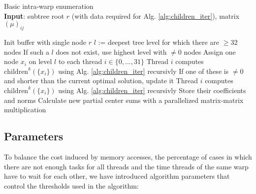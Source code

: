 \documentclass{scrartcl}
\begin{document}
    \begin{algorithm}[H]
        \caption{Basic intra-warp enumeration\label{alg:warp_enum}\\\textbf{Input}: subtree root $r$ (with data required for Alg. \ref{alg:children_iter}), matrix $(\mu)_{ij}$}
        \begin{algorithmic}
            \STATE Init buffer with single node $r$
                \STATE $l$ := deepest tree level for which there are $\geq 32$ nodes
                \STATE If such a $l$ does not exist, use highest level with $\neq 0$ nodes
                \STATE Assign one node $x_i$ on level $l$ to each thread $i \in \{0, ..., 31\}$
                    \STATE Thread $i$ computes $\mathrm{children}^k(\{x_i\})$ using Alg. \ref{alg:children_iter} recursivly
                    \STATE If one of these is $\neq 0$ and shorter than the current optimal solution, update it
                \ELSE
                    \STATE Thread $i$ computes $\mathrm{children}^k(\{x_i\})$ using Alg. \ref{alg:children_iter} recursivly
                    \STATE Store their coefficients and norms
                    \STATE Calculate new partial center sums with a parallelized matrix-matrix multiplication
                \ENDIF
                \ENDWHILE
        \end{algorithmic}
    \end{algorithm}

    \subsection{Parameters}

    To balance the cost induced by memory accesses, the percentage of cases in which there are not enough tasks for all threads and the time threads of the same warp have to wait for each other, we have introduced algorithm parameters that control the thresholds used in the algorithm:
    
\end{document}
